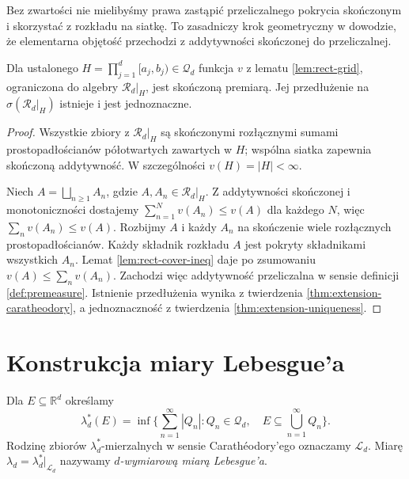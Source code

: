 \begin{uwaga}
Bez zwartości nie mielibyśmy prawa zastąpić
przeliczalnego pokrycia skończonym i skorzystać
z rozkładu na siatkę. To zasadniczy krok geometryczny
w dowodzie, że elementarna objętość przechodzi
z addytywności skończonej do przeliczalnej.
\end{uwaga}

\begin{twierdzenie}
\label{thm:volume-premeasure}
Dla ustalonego $H=\prod_{j=1}^d[a_j,b_j)\in\mathcal Q_d$
funkcja $v$ z lematu \ref{lem:rect-grid}, ograniczona do
algebry $\mathcal R_d|_H$, jest skończoną premiarą.
Jej przedłużenie na $\sigma(\mathcal R_d|_H)$ istnieje
i jest jednoznaczne.
\end{twierdzenie}

\begin{proof}
Wszystkie zbiory z $\mathcal R_d|_H$ są skończonymi
rozłącznymi sumami prostopadłościanów półotwartych
zawartych w $H$; wspólna siatka zapewnia skończoną
addytywność. W szczególności $v(H)=|H|<\infty$.

Niech $A=\bigsqcup_{n\ge1}A_n$, gdzie
$A,A_n\in\mathcal R_d|_H$. Z addytywności skończonej
i monotoniczności dostajemy
$\sum_{n=1}^Nv(A_n)\le v(A)$ dla każdego $N$, więc
$\sum_nv(A_n)\le v(A)$.
Rozbijmy $A$ i każdy $A_n$ na skończenie wiele
rozłącznych prostopadłościanów. Każdy składnik rozkładu
$A$ jest pokryty składnikami wszystkich $A_n$.
Lemat \ref{lem:rect-cover-ineq} daje po zsumowaniu
$v(A)\le\sum_nv(A_n)$. Zachodzi więc addytywność
przeliczalna w sensie definicji \ref{def:premeasure}.
Istnienie przedłużenia wynika z twierdzenia
\ref{thm:extension-caratheodory}, a jednoznaczność
z twierdzenia \ref{thm:extension-uniqueness}.
\end{proof}

\section{Konstrukcja miary Lebesgue'a}

\begin{definicja}
\label{def:lebesgue-outer}
Dla $E\subseteq\mathbb R^d$ określamy
\begin{equation}\label{eq:lebesgue-outer}
\lambda_d^*(E)=\inf\Big\{\sum_{n=1}^\infty|Q_n|:
Q_n\in\mathcal Q_d,\quad E\subseteq\bigcup_{n=1}^\infty Q_n\Big\}.
\end{equation}
Rodzinę zbiorów $\lambda_d^*$-mierzalnych w sensie
Carathéodory'ego oznaczamy $\mathcal L_d$.
Miarę $\lambda_d=\lambda_d^*|_{\mathcal L_d}$
nazywamy \emph{$d$-wymiarową miarą Lebesgue'a}.
\end{definicja}

